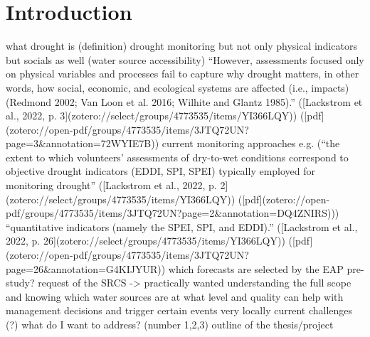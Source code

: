 
\chapter{Introduction} %

\label{Chapter1} %

\newcommand{\keyword}[1]{\textbf{#1}}
\newcommand{\tabhead}[1]{\textbf{#1}}
\newcommand{\code}[1]{\texttt{#1}}
\newcommand{\file}[1]{\texttt{\bfseries#1}}
\newcommand{\option}[1]{\texttt{\itshape#1}}


what drought is (definition)
drought monitoring but not only physical indicators but socials as well (water source accessibility) “However, assessments focused only on physical variables and processes fail to capture why drought matters, in other words, how social, economic, and ecological systems are affected (i.e., impacts) (Redmond 2002; Van Loon et al. 2016; Wilhite and Glantz 1985).” ([Lackstrom et al., 2022, p. 3](zotero://select/groups/4773535/items/YI366LQY)) ([pdf](zotero://open-pdf/groups/4773535/items/3JTQ72UN?page=3\&annotation=72WYIE7B))
current monitoring approaches e.g. (“the extent to which volunteers’ assessments of dry-to-wet conditions correspond to objective drought indicators (EDDI, SPI, SPEI) typically employed for monitoring drought” ([Lackstrom et al., 2022, p. 2](zotero://select/groups/4773535/items/YI366LQY)) ([pdf](zotero://open-pdf/groups/4773535/items/3JTQ72UN?page=2\&annotation=DQ4ZNIRS)))
“quantitative indicators (namely the SPEI, SPI, and EDDI).” ([Lackstrom et al., 2022, p. 26](zotero://select/groups/4773535/items/YI366LQY)) ([pdf](zotero://open-pdf/groups/4773535/items/3JTQ72UN?page=26\&annotation=G4KIJYUR))
which forecasts are selected by the EAP pre-study?
request of the SRCS -> practically wanted
understanding the full scope and knowing which water sources are at what level and quality can help with management decisions and trigger certain events very locally
current challenges (?) what do I want to address? (number 1,2,3)
outline of the thesis/project

